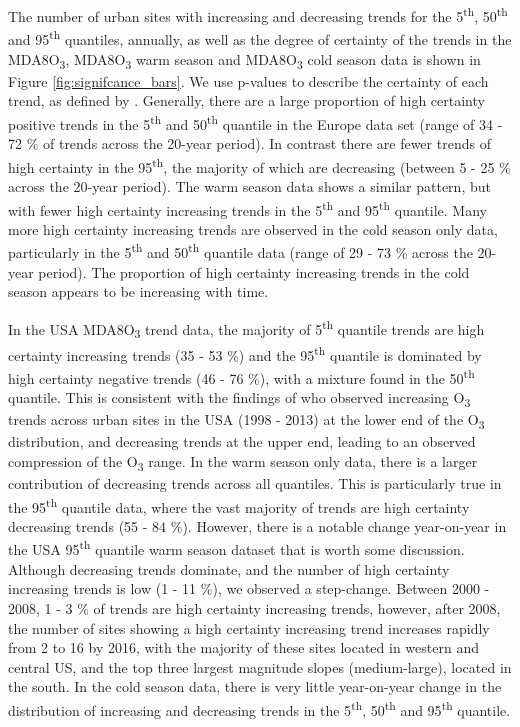 \documentclass[journal abbreviation, manuscript]{copernicus}
\begin{document}
The number of urban sites with increasing and decreasing trends for the 5\textsuperscript{th}, 50\textsuperscript{th} and 95\textsuperscript{th} quantiles, annually, as well as the degree of certainty of the trends in the MDA8O\textsubscript{3}, MDA8O\textsubscript{3} warm season and MDA8O\textsubscript{3} cold season data is shown in Figure \ref{fig:signifcance_bars}. We use p-values to describe the certainty of each trend, as defined by \cite{chang2023guidancenotebeststatistical}.
Generally, there are a large proportion of high certainty positive trends in the 5\textsuperscript{th} and 50\textsuperscript{th} quantile in the Europe data set (range of 34 - 72 \% of trends across the 20-year period). In contrast there are fewer trends of high certainty in the 95\textsuperscript{th}, the majority of which are decreasing (between 5 - 25 \% across the 20-year period). The warm season data shows a similar pattern, but with fewer high certainty increasing trends in the 5\textsuperscript{th} and 95\textsuperscript{th} quantile. Many more high certainty increasing trends are observed in the cold season only data, particularly in the 5\textsuperscript{th} and 50\textsuperscript{th} quantile data (range of 29 - 73 \% across the 20-year period). The proportion of high certainty increasing trends in the cold season appears to be increasing with time.

In the USA MDA8O\textsubscript{3} trend data, the majority of 5\textsuperscript{th} quantile trends are high certainty increasing trends (35 - 53 \%) and the 95\textsuperscript{th} quantile is dominated by high certainty negative trends (46 - 76 \%), with a mixture found in the 50\textsuperscript{th} quantile. This is consistent with the findings of \cite{Simon_2015} who observed increasing O\textsubscript{3} trends across urban sites in the USA (1998 - 2013) at the lower end of the O\textsubscript{3} distribution, and decreasing trends at the upper end, leading to an observed compression of the O\textsubscript{3} range. In the warm season only data, there is a larger contribution of decreasing trends across all quantiles. This is particularly true in the 95\textsuperscript{th} quantile data, where the vast majority of trends are high certainty decreasing trends (55 - 84 \%). However, there is a notable change year-on-year in the USA 95\textsuperscript{th} quantile warm season dataset that is worth some discussion. Although decreasing trends dominate, and the number of high certainty increasing trends is low (1 - 11 \%), we observed a step-change. Between 2000 - 2008, 1 - 3 \% of trends are high certainty increasing trends, however, after 2008, the number of sites showing a high certainty increasing trend increases rapidly from 2 to 16 by 2016, with the majority of these sites located in western and central US, and the top three largest magnitude slopes (medium-large), located in the south. In the cold season data, there is very little year-on-year change in the distribution of increasing and decreasing trends in the 5\textsuperscript{th}, 50\textsuperscript{th} and 95\textsuperscript{th} quantile.
\end{document}
